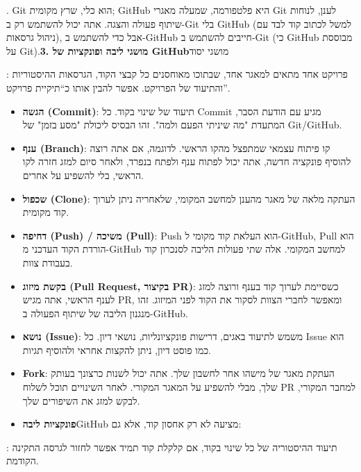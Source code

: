 . Git הוא כלי, שרץ מקומית; GitHub היא פלטפורמה, שמעלה מאגרי Git לענן, לנוחות שיתוף פעולה והצגה. אתה יכול להשתמש רק ב-Git בלי GitHub (למשל לכתוב קוד לבד עם ניהול גרסאות), אבל כדי להשתמש ב-GitHub חייבים להשתמש ב-Git (כי GitHub מבוססת על Git).\textbf{3. מושגי ליבה ופונקציות של GitHub}מושגי יסוד



: פרויקט אחד מתאים למאגר אחד, שבתוכו מאוחסנים כל קבצי הקוד, הגרסאות ההיסטוריות והתיעוד של הפרויקט. אפשר להבין אותו כ“תיקיית פרויקט”.

\begin{itemize}
  \item \textbf{הגשה (Commit)}: תיעוד של שינוי בקוד. כל Commit מגיע עם הודעת הסבר, המתעדת "מה שיניתי הפעם ולמה". זהו הבסיס ליכולת "מסע בזמן" של Git/GitHub.
  \item \textbf{ענף (Branch)}: קו פיתוח עצמאי שמתפצל מהקו הראשי. לדוגמה, אם אתה רוצה להוסיף פונקציה חדשה, אתה יכול לפתוח ענף ולפתח בנפרד, ולאחר סיום למזג חזרה לקו הראשי, בלי להשפיע על אחרים.
  \item \textbf{שכפול (Clone)}: העתקה מלאה של מאגר מהענן למחשב המקומי, שלאחריה ניתן לערוך קוד מקומית.
  \item \textbf{דחיפה (Push) / משיכה (Pull)}: Push הוא העלאת קוד מקומי ל-GitHub, Pull הוא הורדת הקוד העדכני מ-GitHub למחשב המקומי. אלה שתי פעולות הליבה לסנכרון קוד בעבודת צוות.
  \item \textbf{בקשת מיזוג (Pull Request, בקיצור PR)}: כשסיימת לערוך קוד בענף ורוצה למזג לענף הראשי, אתה מגיש PR, ומאפשר לחברי הצוות לסקור את הקוד לפני המיזוג. זהו מנגנון הליבה של שיתוף הפעולה ב-GitHub.
  \item \textbf{נושא (Issue)}: משמש לתיעוד באגים, דרישות פונקציונליות, נושאי דיון. כל Issue הוא כמו פוסט דיון, ניתן להקצות אחראי ולהוסיף תגיות.
  \item \textbf{Fork}: העתקת מאגר של מישהו אחר לחשבון שלך. אתה יכול לשנות כרצונך בעותק שלך, מבלי להשפיע על המאגר המקורי. לאחר השינויים תוכל לשלוח PR למחבר המקורי, לבקש למזג את השיפורים שלך.
  \item \textbf{פונקציות ליבה}GitHub מציעה לא רק אחסון קוד, אלא גם:
\end{itemize}


: תיעוד ההיסטוריה של כל שינוי בקוד, אם קלקלת קוד תמיד אפשר לחזור לגרסה התקינה הקודמת.

